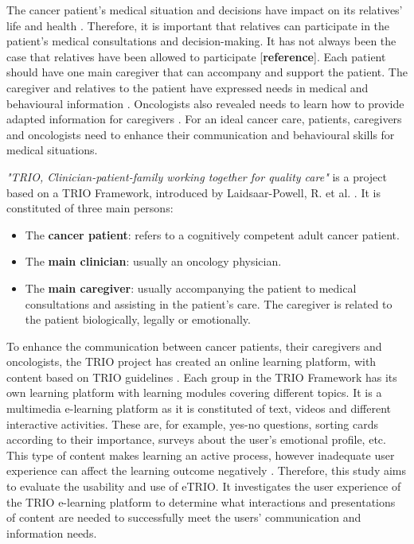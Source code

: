 \documentclass{sigchi}
\begin{document}
The cancer patient’s medical situation and decisions have impact on its relatives’ life and health \cite{Bevans2012}. Therefore, it is important that relatives can participate in the patient’s medical consultations and decision-making. It has not always been the case that relatives have been allowed to participate [\textbf{reference}]. Each patient should have one main caregiver that can accompany and support the patient. The caregiver and relatives to the patient have expressed needs in medical and behavioural information \cite{Lamore2017}. Oncologists also revealed needs to learn how to provide adapted information for caregivers \cite{Stuij2018}. For an ideal cancer care, patients, caregivers and oncologists need to enhance their communication and behavioural skills for medical situations. 

\textit{"TRIO, Clinician-patient-family working together for quality care"} is a project based on a TRIO Framework, introduced by Laidsaar-Powell, R. et al. \cite{Laidsaar-Powell2017}. It is constituted of three main persons:

\begin{itemize}[noitemsep]
    \item The \textbf{cancer patient}: refers to a cognitively competent adult cancer patient.
    \item The \textbf{main clinician}: usually an oncology physician.
    \item The \textbf{main caregiver}: usually accompanying the patient to medical consultations and assisting in the patient’s care. The caregiver is related to the patient biologically, legally or emotionally.
\end{itemize}

To enhance the communication between cancer patients, their caregivers and oncologists, the TRIO project has created an online learning platform, with content based on TRIO guidelines \cite{Laidsaar-Powell2018a} \cite{Laidsaar-Powell2018}. Each group in the TRIO Framework has its own learning platform with learning modules covering different topics. It is a multimedia e-learning platform as it is constituted of text, videos and different interactive activities. These are, for example, yes-no questions, sorting cards according to their importance, surveys about the user’s emotional profile, etc. This type of content makes learning an active process, however inadequate user experience can affect the learning outcome negatively \cite{Huang2005}. Therefore, this study aims to evaluate the usability and use of eTRIO. It investigates the user experience of the TRIO e-learning platform to determine what interactions and presentations of content are needed to successfully meet the users' communication and information needs.
\end{document}
